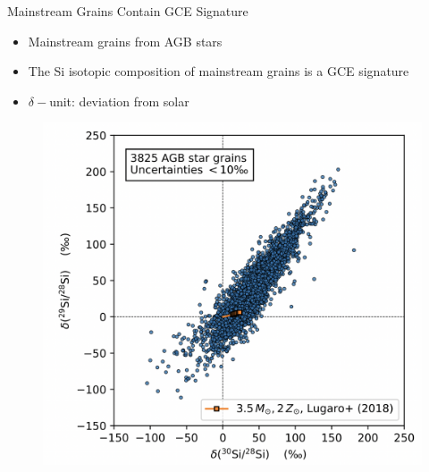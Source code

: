 \documentclass[10pt]{beamer}
\begin{document}
\begin{frame}{Mainstream Grains Contain GCE Signature}
    \begin{minipage}{5cm}
    \begin{itemize}
    \setlength\itemsep{2em}
        \item Mainstream grains from AGB stars
        
        \item The Si isotopic composition of mainstream grains is a GCE signature
        

        \item $\delta-$unit: deviation from solar
        
    \end{itemize}
    \end{minipage}
    \begin{minipage}{6.6cm}
        \begin{figure}
            \centering
            \includegraphics[width = \textwidth]{figs/agb.png}
        \end{figure}
    \end{minipage}
    
\end{frame}
\end{document}
